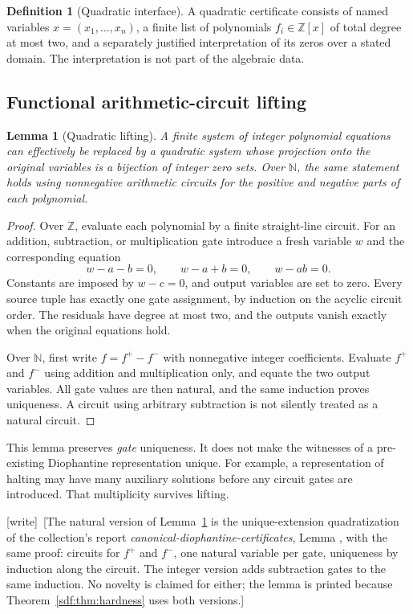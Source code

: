 \documentclass[11pt,a4paper]{article}
\newtheorem{lemma}[theorem]{Lemma}
\theoremstyle{definition}
\newtheorem{definition}[theorem]{Definition}
\theoremstyle{remark}
\newcommand{\N}{\mathbb N}
\newcommand{\Z}{\mathbb Z}
\newcommand{\wtag}{\textup{[write]}}
\begin{document}
\begin{definition}[Quadratic interface]
A quadratic certificate consists of named variables $x=(x_1,\ldots,x_n)$,
a finite list of polynomials $f_i\in\Z[x]$ of total degree at most two,
and a separately justified interpretation of its zeros over a stated domain.
The interpretation is not part of the algebraic data.
\end{definition}

\subsection{Functional arithmetic-circuit lifting}

\begin{lemma}[Quadratic lifting]\label{sdf:lem:lifting}
A finite system of integer polynomial equations can effectively be replaced
by a quadratic system whose projection onto the original variables is a
bijection of integer zero sets. Over $\N$, the same statement holds using
nonnegative arithmetic circuits for the positive and negative parts of each
polynomial.
\end{lemma}
\begin{proof}
Over $\Z$, evaluate each polynomial by a finite straight-line circuit. For an
addition, subtraction, or multiplication gate introduce a fresh variable $w$
and the corresponding equation
\[
 w-a-b=0,\qquad w-a+b=0,\qquad w-ab=0.
\]
Constants are imposed by $w-c=0$, and output variables are set to zero.
Every source tuple has exactly one gate assignment, by induction on the
acyclic circuit order. The residuals have degree at most two, and the outputs
vanish exactly when the original equations hold.

Over $\N$, first write $f=f^+-f^-$ with nonnegative integer coefficients.
Evaluate $f^+$ and $f^-$ using addition and multiplication only, and equate
the two output variables. All gate values are then natural, and the same
induction proves uniqueness. A circuit using arbitrary subtraction is not
silently treated as a natural circuit.
\end{proof}

This lemma preserves \emph{gate} uniqueness. It does not make the witnesses
of a pre-existing Diophantine representation unique. For example, a
representation of halting may have many auxiliary solutions before any
circuit gates are introduced. That multiplicity survives lifting.

\wtag\ [The natural version of Lemma~\ref{sdf:lem:lifting} is the
unique-extension quadratization of the collection's report
\emph{canonical-diophantine-certificates}, Lemma
, with the same proof: circuits for $f^+$
and $f^-$, one natural variable per gate, uniqueness by induction along the
circuit. The integer version adds subtraction gates to the same induction.
No novelty is claimed for either; the lemma is printed because
Theorem~\ref{sdf:thm:hardness} uses both versions.]
\end{document}
